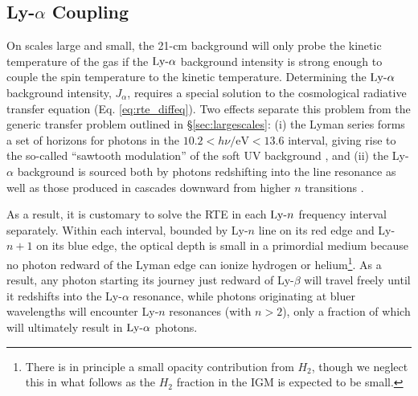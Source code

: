 \subsection{Ly-$\alpha$ Coupling} \label{sec:lya}
On scales large and small, the 21-cm background will only probe the kinetic temperature of the gas if the $\text{Ly-}\alpha$ background intensity is strong enough to couple the spin temperature to the kinetic temperature. Determining the $\text{Ly-}\alpha$ background intensity, $J_{\alpha}$, requires a special solution to the cosmological radiative transfer equation (Eq. \ref{eq:rte_diffeq}). Two effects separate this problem from the generic transfer problem outlined in \S\ref{sec:largescales}: (i) the Lyman series forms a set of horizons for photons in the $10.2 < h \nu / \mathrm{eV} < 13.6$ interval, giving rise to the so-called ``sawtooth modulation'' of the soft UV background \cite{Haiman1997}, and (ii) the Ly-$\alpha$ background is sourced both by photons redshifting into the line resonance as well as those produced in cascades downward from higher $n$ transitions \cite{Pritchard2006}.

As a result, it is customary to solve the RTE in each $\text{Ly-}n$ frequency interval separately. Within each interval, bounded by Ly-$n$ line on its red edge and Ly-$n+1$ on its blue edge, the optical depth is small in a primordial medium because no photon redward of the Lyman edge can ionize hydrogen or helium\footnote{There is in principle a small opacity contribution from $H_2$, though we neglect this in what follows as the $H_2$ fraction in the IGM is expected to be small.}. As a result, any photon starting its journey just redward of Ly-$\beta$ will travel freely until it redshifts into the Ly-$\alpha$ resonance, while photons originating at bluer wavelengths will encounter Ly-$n$ resonances (with $n>2$), only a fraction of which will ultimately result in $\text{Ly-}\alpha$ photons.

